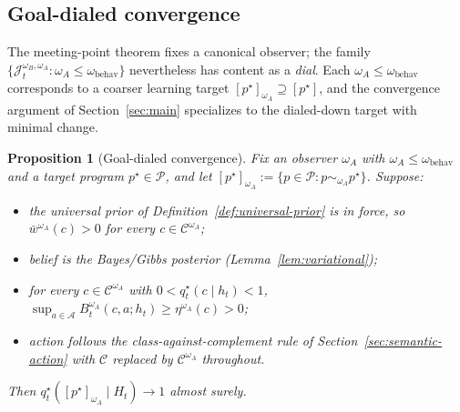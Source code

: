 \documentclass[11pt]{article}
\newtheorem{proposition}[theorem]{Proposition}
\theoremstyle{definition}
\theoremstyle{remark}
\newcommand{\Acal}{\mathcal{A}}
\newcommand{\Ccal}{\mathcal{C}}
\newcommand{\Pcal}{\mathcal{P}}
\begin{document}
\subsection{Goal-dialed convergence}
\label{sec:goal-dialed}

The meeting-point theorem fixes a canonical observer; the family $\{\mathcal J_t^{\omega_B,\omega_A}:\omega_A\le\omega_{\mathrm{behav}}\}$ nevertheless has content as a \emph{dial}. Each $\omega_A\le\omega_{\mathrm{behav}}$ corresponds to a coarser learning target $[p^\star]_{\omega_A}\supseteq[p^\star]$, and the convergence argument of Section~\ref{sec:main} specializes to the dialed-down target with minimal change.

\begin{proposition}[Goal-dialed convergence]
\label{prop:goal-dialed}
Fix an observer $\omega_A$ with $\omega_A\le\omega_{\mathrm{behav}}$ and a target program $p^\star\in\Pcal$, and let $[p^\star]_{\omega_A}:=\{p\in\Pcal:p\sim_{\omega_A}p^\star\}$. Suppose:
\begin{itemize}
\item[\textup{(C1$^{\omega_A}$)}] the universal prior of Definition~\ref{def:universal-prior} is in force, so $\bar w^{\omega_A}(c)>0$ for every $c\in\Ccal^{\omega_A}$;
\item[\textup{(C2)}] belief is the Bayes/Gibbs posterior (Lemma~\ref{lem:variational});
\item[\textup{(C3$^{\omega_A}$)}] for every $c\in\Ccal^{\omega_A}$ with $0<q_t^\star(c\mid h_t)<1$, $\sup_{a\in\Acal}B_t^{\omega_A}(c,a;h_t)\ge\eta^{\omega_A}(c)>0$;
\item[\textup{(C4$^{\omega_A}$)}] action follows the class-against-complement rule of Section~\ref{sec:semantic-action} with $\Ccal$ replaced by $\Ccal^{\omega_A}$ throughout.
\end{itemize}
Then $q_t^\star([p^\star]_{\omega_A}\mid H_t)\to 1$ almost surely.
\end{proposition}
\end{document}
